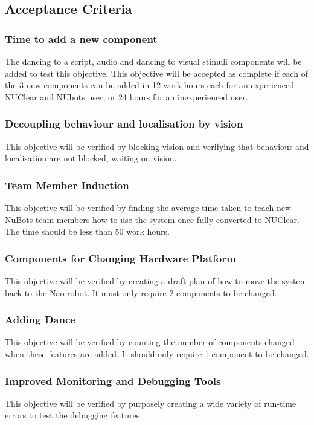 \documentclass[english,12pt]{scrartcl}
\begin{document}
		\subsection {Acceptance Criteria}
			\subsubsection{Time to add a new component}
				The dancing to a script, audio and dancing to visual stimuli components will be added to test this objective.
				This objective will be accepted as complete if each of the 3 new components can be added in 12 work hours each for an experienced NUClear and NUbots user, or 24 hours for an inexperienced user. 
			
			\subsubsection{Decoupling behaviour and localisation by vision}
				This objective will be verified by blocking vision and verifying that behaviour and localisation are not blocked, waiting on vision.
			
			\subsubsection{Team Member Induction}
				This objective will be verified by finding the average time taken to teach new NuBots team members how to use the system once fully converted to NUClear. 
				The time should be less than 50 work hours.
			
			\subsubsection{Components for Changing Hardware Platform}
				This objective will be verified by creating a draft plan of how to move the system back to the Nao robot. It must only require 2 components to be changed.
			
			\subsubsection{Adding Dance}
				This objective will be verified by counting the number of components changed when these features are added.
				It should only require 1 component to be changed. 
			
			\subsubsection{Improved Monitoring and Debugging Tools}
				This objective will be verified by purposely creating a wide variety of run-time errors to test the debugging features.
			
\end{document}
